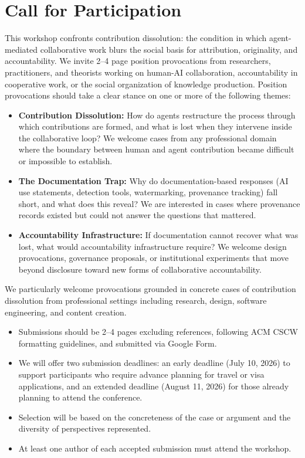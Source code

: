 \documentclass[manuscript,review]{acmart}
\begin{document}
\section{Call for Participation}
This workshop confronts contribution dissolution: the condition in which agent-mediated collaborative work blurs the social basis for attribution, originality, and accountability. We invite 2--4 page position provocations from researchers, practitioners, and theorists working on human-AI collaboration, accountability in cooperative work, or the social organization of knowledge production. Position provocations should take a clear stance on one or more of the following themes:
\begin{itemize}
\item \textbf{Contribution Dissolution:} How do agents restructure the process through which contributions are formed, and what is lost when they intervene inside the collaborative loop? We welcome cases from any professional domain where the boundary between human and agent contribution became difficult or impossible to establish.
\item \textbf{The Documentation Trap:} Why do documentation-based responses (AI use statements, detection tools, watermarking, provenance tracking) fall short, and what does this reveal? We are interested in cases where provenance records existed but could not answer the questions that mattered.
\item \textbf{Accountability Infrastructure:} If documentation cannot recover what was lost, what would accountability infrastructure require? We welcome design provocations, governance proposals, or institutional experiments that move beyond disclosure toward new forms of collaborative accountability.
\end{itemize}
We particularly welcome provocations grounded in concrete cases of contribution dissolution from professional settings including research, design, software engineering, and content creation.
\begin{itemize}
\item Submissions should be 2--4 pages excluding references, following ACM CSCW formatting guidelines, and submitted via Google Form.
\item We will offer two submission deadlines: an early deadline (July 10, 2026) to support participants who require advance planning for travel or visa applications, and an extended deadline (August 11, 2026) for those already planning to attend the conference.
\item Selection will be based on the concreteness of the case or argument and the diversity of perspectives represented.
\item At least one author of each accepted submission must attend the workshop.
\end{itemize}
\end{document}
